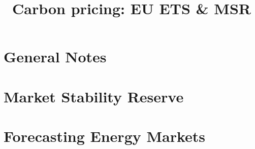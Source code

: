 \documentclass{article}
\title{Carbon pricing: EU ETS \& MSR}
\begin{document}
	
	\maketitle
	
	\section{General Notes}
	
			
	
	
	\section{Market Stability Reserve}
		
		
	\section{Forecasting Energy Markets}
		
		
		
	
	 
	
\end{document}
